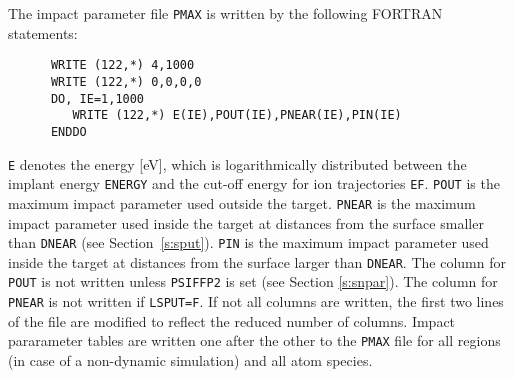The impact parameter file \texttt{PMAX} is written by the following FORTRAN statements:
%
\begin{verbatim}
      WRITE (122,*) 4,1000
      WRITE (122,*) 0,0,0,0
      DO, IE=1,1000
         WRITE (122,*) E(IE),POUT(IE),PNEAR(IE),PIN(IE)
      ENDDO
\end{verbatim}
%
\texttt{E} denotes the energy [eV], which is logarithmically distributed between
the implant energy \texttt{ENERGY} and the cut-off energy for ion trajectories
\texttt{EF}. \texttt{POUT} is the maximum impact parameter used outside the
target. \texttt{PNEAR} is the maximum impact parameter used inside the target at
distances from the surface smaller than \texttt{DNEAR} (see
Section~\ref{s:sput}). \texttt{PIN} is the maximum impact parameter used inside
the target at distances from the surface larger than \texttt{DNEAR}. The column
for \texttt{POUT} is not written unless \texttt{PSIFFP2} is set (see Section
\ref{s:snpar}). The column for \texttt{PNEAR} is not written if
\texttt{LSPUT=F}. If not all columns are written, the first two lines of the
file are modified to reflect the reduced number of columns. Impact pararameter
tables are written one after the other to the \texttt{PMAX} file for all regions
(in case of a non-dynamic simulation) and all atom species.

